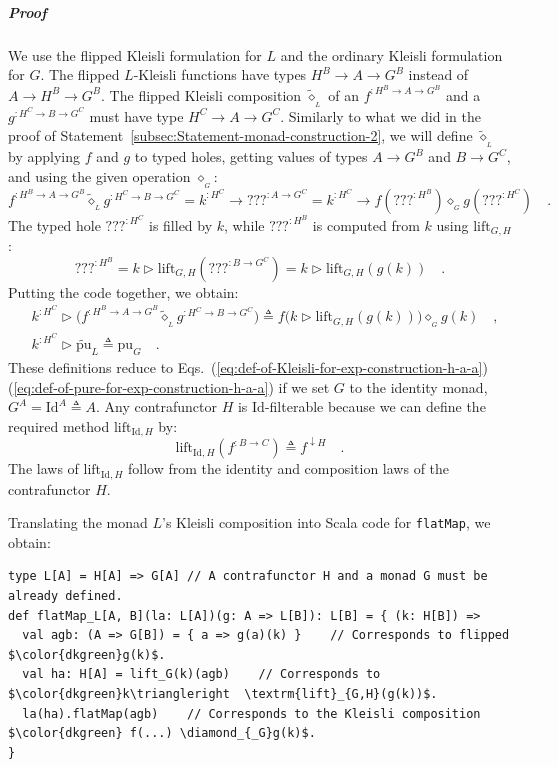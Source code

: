 \subparagraph{Proof}

We use the flipped Kleisli formulation for $L$ and the ordinary Kleisli
formulation for $G$. The flipped $L$-Kleisli functions have types
$H^{B}\rightarrow A\rightarrow G^{B}$ instead of $A\rightarrow H^{B}\rightarrow G^{B}$.
The flipped Kleisli composition $\tilde{\diamond}_{_{L}}$ of an $f^{:H^{B}\rightarrow A\rightarrow G^{B}}$
and a $g^{:H^{C}\rightarrow B\rightarrow G^{C}}$ must have type $H^{C}\rightarrow A\rightarrow G^{C}$.
Similarly to what we did in the proof of Statement~\ref{subsec:Statement-monad-construction-2},
we will define $\tilde{\diamond}_{_{L}}$ by applying $f$ and $g$
to typed holes, getting values of types $A\rightarrow G^{B}$ and
$B\rightarrow G^{C}$, and using the given operation $\diamond_{_{G}}$:
\[
f^{:H^{B}\rightarrow A\rightarrow G^{B}}\tilde{\diamond}_{_{L}}g^{:H^{C}\rightarrow B\rightarrow G^{C}}=k^{:H^{C}}\rightarrow\text{???}^{:A\rightarrow G^{C}}=k^{:H^{C}}\rightarrow f(\text{???}^{:H^{B}})\diamond_{_{G}}g(\text{???}^{:H^{C}})\quad.
\]
The typed hole $\text{???}^{:H^{C}}$ is filled by $k$, while $\text{???}^{:H^{B}}$
is computed from $k$ using $\text{lift}_{G,H}$:
\[
\text{???}^{:H^{B}}=k\triangleright\text{lift}_{G,H}(\text{???}^{:B\rightarrow G^{C}})=k\triangleright\text{lift}_{G,H}(g(k))\quad.
\]
Putting the code together, we obtain:
\begin{align*}
 & k^{:H^{C}}\triangleright\big(f^{:H^{B}\rightarrow A\rightarrow G^{B}}\tilde{\diamond}_{_{L}}g^{:H^{C}\rightarrow B\rightarrow G^{C}}\big)\triangleq f\big(k\triangleright\text{lift}_{G,H}(g(k))\big)\diamond_{_{G}}g(k)\quad,\\
 & k^{:H^{C}}\triangleright\tilde{\text{pu}}_{L}\triangleq\text{pu}_{G}\quad.
\end{align*}
These definitions reduce to Eqs.~(\ref{eq:def-of-Kleisli-for-exp-construction-h-a-a})\textendash (\ref{eq:def-of-pure-for-exp-construction-h-a-a})
if we set $G$ to the identity monad, $G^{A}=\text{Id}^{A}\triangleq A$.
Any contrafunctor $H$ is $\text{Id}$-filterable because we can define
the required method $\text{lift}_{\text{Id},H}$ by:
\[
\text{lift}_{\text{Id},H}(f^{:B\rightarrow C})\triangleq f^{\downarrow H}\quad.
\]
The laws of $\text{lift}_{\text{Id},H}$ follow from the identity
and composition laws of the contrafunctor $H$.

Translating the monad $L$\textsf{'}s Kleisli composition into Scala code for
\lstinline!flatMap!, we obtain:
\begin{lstlisting}[mathescape=true]
type L[A] = H[A] => G[A] // A contrafunctor H and a monad G must be already defined.
def flatMap_L[A, B](la: L[A])(g: A => L[B]): L[B] = { (k: H[B]) =>
  val agb: (A => G[B]) = { a => g(a)(k) }    // Corresponds to flipped $\color{dkgreen}g(k)$.
  val ha: H[A] = lift_G(k)(agb)    // Corresponds to $\color{dkgreen}k\triangleright  \textrm{lift}_{G,H}(g(k))$.
  la(ha).flatMap(agb)    // Corresponds to the Kleisli composition $\color{dkgreen} f(...) \diamond_{_G}g(k)$.
}
\end{lstlisting}

